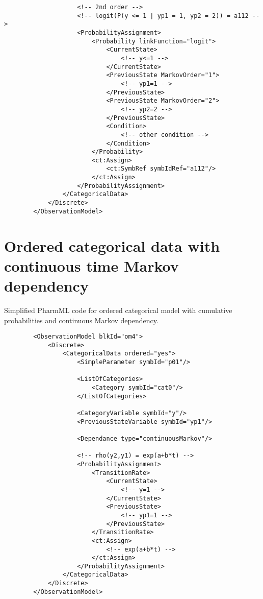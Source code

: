 \begin{lstlisting}
                    <!-- 2nd order -->
                    <!-- logit(P(y <= 1 | yp1 = 1, yp2 = 2)) = a112 -->
                    <ProbabilityAssignment>
                        <Probability linkFunction="logit">
                            <CurrentState>
                                <!-- y<=1 -->
                            </CurrentState>
                            <PreviousState MarkovOrder="1">
                                <!-- yp1=1 -->
                            </PreviousState>
                            <PreviousState MarkovOrder="2">
                                <!-- yp2=2 -->
                            </PreviousState>
                            <Condition>
                                <!-- other condition -->
                            </Condition>
                        </Probability>
                        <ct:Assign>
                            <ct:SymbRef symbIdRef="a112"/>
                        </ct:Assign>
                    </ProbabilityAssignment>
                </CategoricalData>
            </Discrete>
        </ObservationModel>
\end{lstlisting}

\section{Ordered categorical data with continuous time Markov dependency}
Simplified PharmML code for ordered categorical model with cumulative probabilities 
and continuous Markov dependency.
\lstset{language=XML}
\begin{lstlisting}
        <ObservationModel blkId="om4">
            <Discrete>
                <CategoricalData ordered="yes">
                    <SimpleParameter symbId="p01"/>
                    
                    <ListOfCategories>
                        <Category symbId="cat0"/>
                    </ListOfCategories>
                    
                    <CategoryVariable symbId="y"/>
                    <PreviousStateVariable symbId="yp1"/>
                    
                    <Dependance type="continuousMarkov"/>
                    
                    <!-- rho(y2,y1) = exp(a+b*t) -->
                    <ProbabilityAssignment>
                        <TransitionRate>
                            <CurrentState>
                                <!-- y=1 -->
                            </CurrentState>
                            <PreviousState>
                                <!-- yp1=1 -->
                            </PreviousState>
                        </TransitionRate>
                        <ct:Assign>
                            <!-- exp(a+b*t) -->
                        </ct:Assign>
                    </ProbabilityAssignment>
                </CategoricalData>
            </Discrete>
        </ObservationModel>
\end{lstlisting}

